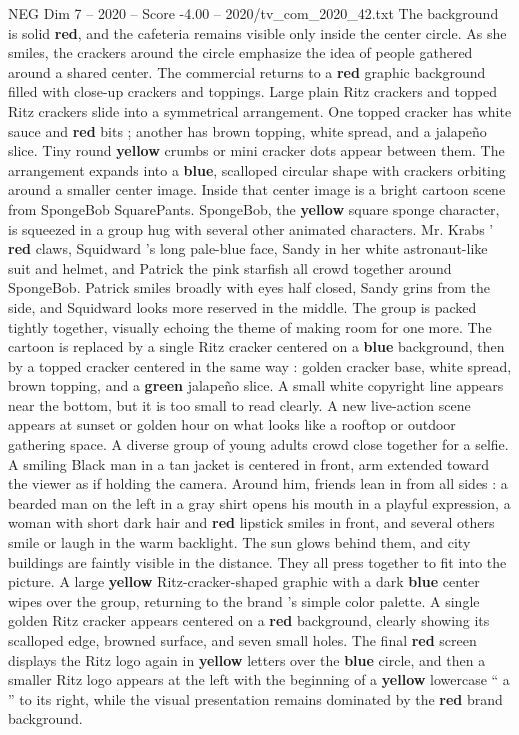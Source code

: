 \begin{textsample}{NEG Dim 7 – 2020 – Score -4.00 – 2020/tv\_com\_2020\_42.txt}
The background is solid \textbf{red}, and the cafeteria remains visible only inside the center circle.
As she smiles, the crackers around the circle emphasize the idea of people gathered around a shared center.
The commercial returns to a \textbf{red} graphic background filled with close-up crackers and toppings.
Large plain Ritz crackers and topped Ritz crackers slide into a symmetrical arrangement.
One topped cracker has white sauce and \textbf{red} bits ; another has brown topping, white spread, and a jalapeño slice.
Tiny round \textbf{yellow} crumbs or mini cracker dots appear between them.
The arrangement expands into a \textbf{blue}, scalloped circular shape with crackers orbiting around a smaller center image.
Inside that center image is a bright cartoon scene from SpongeBob SquarePants.
SpongeBob, the \textbf{yellow} square sponge character, is squeezed in a group hug with several other animated characters.
Mr.
Krabs ’ \textbf{red} claws, Squidward ’s long pale-blue face, Sandy in her white astronaut-like suit and helmet, and Patrick the pink starfish all crowd together around SpongeBob.
Patrick smiles broadly with eyes half closed, Sandy grins from the side, and Squidward looks more reserved in the middle.
The group is packed tightly together, visually echoing the theme of making room for one more.
The cartoon is replaced by a single Ritz cracker centered on a \textbf{blue} background, then by a topped cracker centered in the same way : golden cracker base, white spread, brown topping, and a \textbf{green} jalapeño slice.
A small white copyright line appears near the bottom, but it is too small to read clearly.
A new live-action scene appears at sunset or golden hour on what looks like a rooftop or outdoor gathering space.
A diverse group of young adults crowd close together for a selfie.
A smiling Black man in a tan jacket is centered in front, arm extended toward the viewer as if holding the camera.
Around him, friends lean in from all sides : a bearded man on the left in a gray shirt opens his mouth in a playful expression, a woman with short dark hair and \textbf{red} lipstick smiles in front, and several others smile or laugh in the warm backlight.
The sun glows behind them, and city buildings are faintly visible in the distance.
They all press together to fit into the picture.
A large \textbf{yellow} Ritz-cracker-shaped graphic with a dark \textbf{blue} center wipes over the group, returning to the brand ’s simple color palette.
A single golden Ritz cracker appears centered on a \textbf{red} background, clearly showing its scalloped edge, browned surface, and seven small holes.
The final \textbf{red} screen displays the Ritz logo again in \textbf{yellow} letters over the \textbf{blue} circle, and then a smaller Ritz logo appears at the left with the beginning of a \textbf{yellow} lowercase “ a ” to its right, while the visual presentation remains dominated by the \textbf{red} brand background.

\end{textsample}

